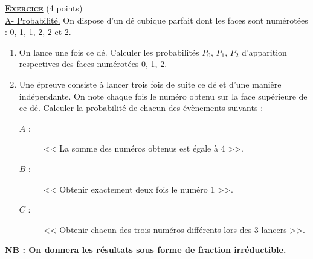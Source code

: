 \providecommand{\dx}{\mathrm{d}x}
\providecommand{\Re}[1]{\mathrm{Re}\left( #1 \right)}
\providecommand{\Im}[1]{\mathrm{Im}\left( #1 \right)}
\providecommand{\dt}{\mathrm{d}t}
\providecommand{\Ouv}{(O;\vec{u},\vec{v})}
\providecommand{\mes}[2]{\mathrm{mes}\left( \widehat{ \overrightarrow{#1} ; \overrightarrow{#2} } \right)}
\providecommand{\D}{(\mathscr{D})}
\providecommand{\Courbe}{(\mathscr{C})}
\providecommand{\congru}[3]{#1 \equi #2 \quad \left[ \mathrm{mod}~#3\right]}
%
\noindent \underline{\textsc{\textbf{Exercice}}} (4 points) \\%
      \underline{A- Probabilit\'e.} \newline
      On dispose d'un d\'e cubique parfait dont les faces sont num\'erot\'ees : 0, 1, 1, 2, 2 et 2.
      \begin{enumerate}
            \item On lance une fois ce d\'e. 
                  Calculer les probabilit\'es $P_0$, $P_1$, $P_2$ d'apparition respectives des faces num\'erot\'ees 0, 1, 2.
            \item Une \'epreuve consiste \`a lancer trois fois de suite ce d\'e et d'une mani\`ere ind\'ependante.
                  On note chaque fois le num\'ero obtenu sur la face sup\'erieure de ce d\'e.
                  Calculer la probabilit\'e de chacun des \'ev\`enements suivants :
                  \begin{description}
                        \item[$A$ :] << La somme des num\'eros obtenus est \'egale \`a 4 >>.
                        \item[$B$ :] << Obtenir exactement deux fois le num\'ero 1 >>.
                        \item[$C$ :] << Obtenir chacun des trois num\'eros diff\'erents lors des 3 lancers >>.
                  \end{description}
      \end{enumerate}

            \textbf{\underline{NB :} On donnera les r\'esultats sous forme de fraction irr\'eductible.}

